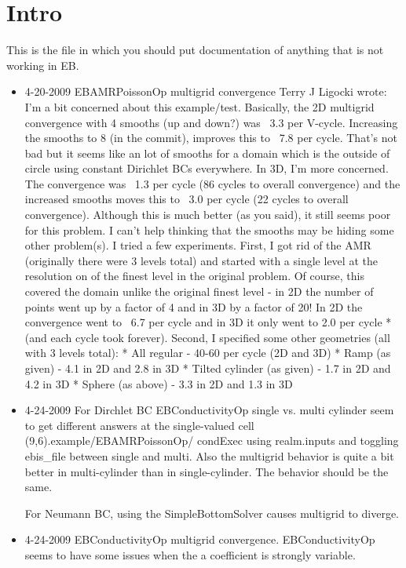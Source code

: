 \section{Intro}

This is the file in which you should put documentation of anything
that is not working in EB.


\begin{itemize}
\item{4-20-2009}  EBAMRPoissonOp multigrid convergence
Terry J Ligocki wrote:
 I'm a bit concerned about this example/test.  Basically, the 2D multigrid convergence with 4 smooths (up and down?) was ~3.3 per V-cycle.  Increasing the smooths to 8 (in the commit), improves this to ~7.8 per cycle.  That's not bad but it seems like an lot of smooths for a domain which is the outside of circle using constant Dirichlet BCs everywhere.
 In 3D, I'm more concerned.  The convergence was ~1.3 per cycle (86 cycles to overall convergence) and the increased smooths moves this to ~3.0 per cycle (22 cycles to overall convergence).  Although this is much better (as you said), it still seems poor for this problem.
 I can't help thinking that the smooths may be hiding some other problem(s).  I tried a few experiments.
 First, I got rid of the AMR (originally there were 3 levels total) and started with a single level at the resolution on of the finest level in the original problem.  Of course, this covered the domain unlike the original finest level - in 2D the number of points went up by a factor of 4 and in 3D by a factor of 20!  In 2D the convergence went to ~6.7 per cycle and in 3D it only went to 2.0 per cycle *(and each cycle took forever).
 Second, I specified some other geometries (all with 3 levels total):
    * All regular - 40-60 per cycle (2D and 3D)
    * Ramp (as given) - 4.1 in 2D and 2.8 in 3D
    * Tilted cylinder (as given) - 1.7 in 2D and 4.2 in 3D
    * Sphere (as above) - 3.3 in 2D and 1.3 in 3D 

\item{4-24-2009}  For Dirchlet BC EBConductivityOp single vs. multi cylinder seem to
  get different answers at the single-valued cell (9,6).example/EBAMRPoissonOp/ condExec using realm.inputs and toggling ebis_file between single and multi.
Also the multigrid behavior is quite a bit better in multi-cylinder than in single-cylinder. The behavior should be the same.

For Neumann BC, using the SimpleBottomSolver causes multigrid to diverge. 

\item{4-24-2009}  EBConductivityOp multigrid convergence.
  EBConductivityOp seems to have some issues when the a coefficient is
  strongly variable.


\end{itemize}
